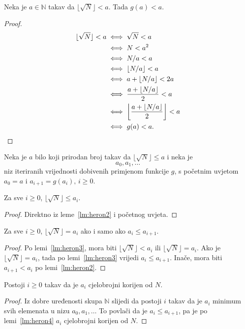 \documentclass[12pt]{scrartcl}
\begin{document}
\begin{lema}\label{lm:heron2}
    Neka je $a\in\mathbb N$ takav da $\lfloor\sqrt{N}\rfloor<a$. Tada $g(a)<a$.
\end{lema}
\begin{proof}
    \begin{align*}
        \lfloor\sqrt{N}\rfloor<a &\iff \sqrt{N}<a\\
        &\iff N<a^2\\
        &\iff N/a<a\\
        &\iff \lfloor N/a\rfloor < a\\
        &\iff a+\lfloor N/a\rfloor < 2a\\
        &\iff \frac{a+\lfloor N/a\rfloor}{2}<a\\
        &\iff \left\lfloor\frac{a+\lfloor N/a\rfloor}{2}\right\rfloor < a\\
        &\iff g(a) < a\text.
    \end{align*}
\end{proof}

Neka je $a$ bilo koji prirodan broj takav da $\lfloor\sqrt{N}\rfloor\leq a$ i neka je
\begin{equation*}
    a_0,a_1,\dotsc
\end{equation*}
niz iteriranih vrijednosti dobivenih primjenom funkcije $g$, s početnim uvjetom $a_0=a$ i $a_{i+1}=g(a_i),\,i\geq 0$.
\begin{lema}\label{lm:heron3}
    Za sve $i\geq 0$, $\lfloor\sqrt{N}\rfloor\leq a_i$.
\end{lema}
\begin{proof}
    Direktno iz leme~\ref{lm:heron2} i početnog uvjeta.
\end{proof}

\begin{lema}\label{lm:heron4}
    Za sve $i\geq 0$, $\lfloor\sqrt{N}\rfloor=a_i$ ako i samo ako $a_i \leq a_{i+1}$.
\end{lema}
\begin{proof}
    Po lemi~\ref{lm:heron3}, mora biti $\lfloor\sqrt{N}\rfloor < a_i$ ili $\lfloor\sqrt{N}\rfloor = a_i$. Ako je $\lfloor\sqrt{N}\rfloor = a_i$,
    tada po lemi~\ref{lm:heron3} vrijedi $a_i \leq a_{i+1}$. Inače, mora biti $a_{i+1} < a_i$ po lemi~\ref{lm:heron2}.
\end{proof}
\begin{teorem}\label{tm:heron}
    Postoji $i\geq0$ takav da je $a_i$ cjelobrojni korijen od $N$.
\end{teorem}
\begin{proof}
    Iz dobre uređenosti skupa $\mathbb N$ slijedi da postoji $i$ takav da je $a_i$ minimum svih elemenata u nizu $a_0,a_1,\dotsc$
    To povlači da je $a_i \leq a_{i+1}$, pa je po lemi~\ref{lm:heron4} $a_i$ cjelobrojni korijen od $N$.
\end{proof}
\end{document}
